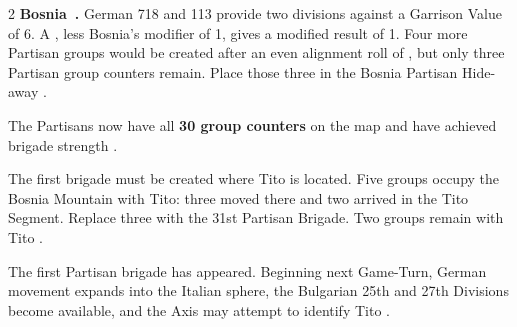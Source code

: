 \begin{multicols}{2}
\textbf{Bosnia~.} German 718 and 113 provide two divisions against
a Garrison Value of 6. A , less Bosnia's modifier of 1, gives a modified
result of 1. Four more Partisan groups would be created after an even alignment
roll of , but only three Partisan group counters remain. Place those
three in the Bosnia Partisan Hide-away .

The Partisans now have all \textbf{30 group counters} on the map and have
achieved brigade strength .


The first brigade must be created where Tito is located. Five groups occupy
the Bosnia Mountain with Tito: three moved there and two arrived in the Tito
Segment. Replace three with the 31st Partisan Brigade. Two groups remain with
Tito .

\begin{commentarybox}[title={The important trigger}]
The first Partisan brigade has appeared. Beginning next Game-Turn, German
movement expands into the Italian sphere, the Bulgarian 25th and 27th
Divisions become available, and the Axis may attempt to identify Tito
.
\end{commentarybox}
\end{multicols}


